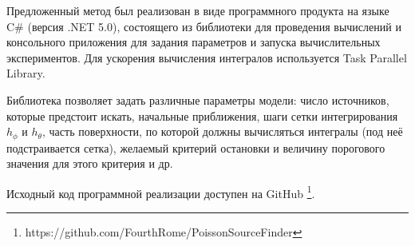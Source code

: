 Предложенный метод был реализован в виде программного продукта на языке C\# (версия .NET 5.0), состоящего из библиотеки для проведения вычислений и консольного приложения для задания параметров и запуска вычислительных экспериментов. Для ускорения вычисления интегралов используется Task Parallel Library.

Библиотека позволяет задать различные параметры модели: число источников, которые предстоит искать, начальные приближения, шаги сетки интегрирования $h_\phi$ и $h_\theta$, часть поверхности, по которой должны вычисляться интегралы (под неё подстраивается сетка), желаемый критерий остановки и величину порогового значения для этого критерия и др.

Исходный код программной реализации доступен на GitHub \footnote{https://github.com/FourthRome/PoissonSourceFinder}.